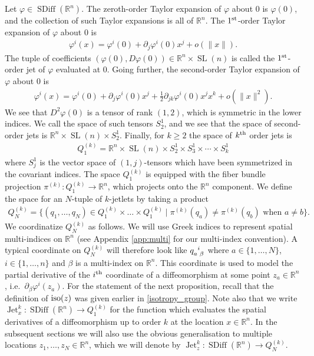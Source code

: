 \documentclass[12pt]{amsart}
\newcommand{\R}{\ensuremath{\mathbb{R}}}
\DeclareMathOperator{\SDiff}{SDiff}
\DeclareMathOperator{\Jet}{Jet}
\DeclareMathOperator{\SL}{SL}
\begin{document}
  Let $\varphi \in \SDiff(\R^n)$.
  The zeroth-order Taylor expansion of $\varphi$ about $0$
  is $\varphi(0)$, and the collection of such Taylor
  expansions is all of $\R^n$.
  The $1^{\rm st}$-order Taylor expansion of $\varphi$ about $0$ is
  \begin{align*}
    \varphi^i( x) = \varphi^i(0) + \partial_j \varphi^i(0) x^j + o( \|x\|).
  \end{align*}
  The tuple of coefficients $(\varphi(0) , D\varphi(0) ) \in \R^n \times \SL(n)$ is
  called the $1^{\rm st}$-order jet of $\varphi$ evaluated at $0$.
  Going further, the second-order Taylor expansion of $\varphi$ about $0$
  is
  \begin{align*}
    \varphi^i(x) = \varphi^i(0) + \partial_j \varphi^i(0) x^j + 
    \frac{1}{2} \partial_{jk} \varphi^i(0) x^j x^k + o( \| x\|^2).
  \end{align*}
  We see that $D^2\varphi(0)$ is a tensor of rank $(1,2)$, which is
  symmetric in the lower indices.
  We call the space of such tensors $S^1_2$,
  and we see that the space of second-order jets is $\R^n \times \SL(n) \times S^1_2$.
  Finally, for $k \geq 2$ the space of $k^{\rm th}$ order jets is
  \begin{align*}
    Q_1^{(k)} = \R^n \times \SL(n) \times S^1_2 \times S^1_3 \times \cdots\times S^1_k
  \end{align*}
  where $S^1_j$ is the vector space of $(1,j)$-tensors which
  have been symmetrized in the covariant indices.
  The space $Q_1^{(k)}$ is equipped with the fiber bundle
  projection $\pi^{(k)} : Q_1^{(k)} \to \R^n$,
  which projects onto the $\R^n$ component.
  We define the space for an $N$-tuple of $k$-jetlets by taking a product
  \begin{align*}
    Q^{(k)}_N = \{ (q_1,\dots, q_N) \in Q_1^{(k)} \times \dots \times Q_1^{(k)}
    \mid \pi^{(k)}(q_a) \neq \pi^{(k)}(q_b) \text{ when } a \neq b \}.
  \end{align*}
  We coordinatize $Q^{(k)}_N$ as follows.
  We will use Greek indices to represent spatial
  multi-indices on $\R^n$ (see Appendix \ref{app:multi} for our multi-index convention).
  A typical coordinate on $Q^{(k)}_N$ will therefore look
  like $q\indices{_a^i_\beta}$ where $a \in \{1,\dots,N\}$, $i \in \{ 1 , \dots, n \}$
  and $\beta$ is a multi-index on $\R^n$.
  This coordinate is used to model the partial derivative of the $i^{\rm th}$ coordinate
  of a diffeomorphism at some point $z_a \in \R^n$, i.e.\ $\partial_\beta \varphi^i(z_a)$.
  For the statement of the next proposition, recall that the definition  of ${\rm iso}(z)$ was given earlier in \eqref{isotropy_group}. Note also that we write $\Jet^k_x: \SDiff(\R^n) \to Q_1^{(k)}$ for
    the function which evaluates the spatial derivatives
    of a diffeomorphism up to order $k$ at the location $x \in \R^n$. In the subsequent sections we will also use the obvious generalisation to multiple locations $z_1, \ldots, z_N \in \R^n$, which we will denote by $\Jet^k_z : \SDiff(\R^n) \to Q_N^{(k)}$.  
\end{document}
